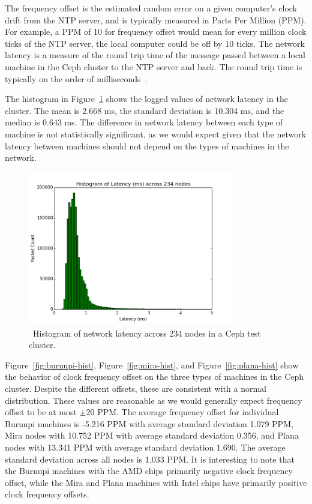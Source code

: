 The frequency offset is the estimated random error on a given computer's
clock drift from the NTP server, and is typically measured in Parts
Per Million (PPM). For example, a PPM of 10 for frequency offset would
mean for every million clock ticks of the NTP server, the local
computer could be off by 10 ticks. The network latency is a measure of
the round trip time of the message passed between a local machine in
the Ceph cluster to the NTP server and back. The round trip time
is typically on the order of milliseconds~\cite{Sage}.


The histogram in Figure~\ref{fig:latency-hist} shows the logged
values of network latency in the cluster. The mean is 2.668 ms, the 
standard deviation is 10.304 ms, and the median is 0.643 ms. The 
difference in network latency between each type of machine is not
statistically significant, as we would expect given that the network
latency between machines should not depend on the types of 
machines in the network. 

\begin{figure}[h]
  \centering
  \caption{~Histogram of network latency across 234 nodes in a Ceph test cluster.} 
  \label{fig:latency-hist}
  \includegraphics[width=0.8\textwidth]{latency-hist.png}
\end{figure}

Figure~\ref{fig:burnupi-hist}, Figure~\ref{fig:mira-hist},
and Figure~\ref{fig:plana-hist} show the behavior of clock frequency offset
on the three types of machines in the Ceph cluster. Despite the different offsets, 
these are consistent with a normal distribution. These values are reasonable 
as we would generally expect frequency offset to be at most $\pm 20$ PPM. 
The average frequency offset for individual Burnupi machines is -5.216 PPM with 
average standard deviation 1.079 PPM, Mira nodes with 10.752 PPM with average
standard deviation 0.356, and Plana nodes with 13.341 PPM with average standard deviation 1.690. The average standard deviation across all nodes is
1.033 PPM. It is interesting to note that the Burnupi machines with 
the AMD chips primarily negative clock frequency offset, while the 
Mira and Plana machines with Intel chips have primarily positive 
clock frequency offsets.

